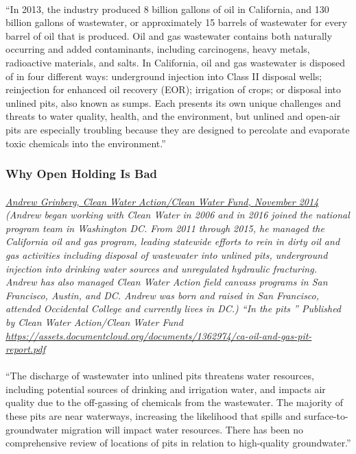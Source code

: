 \documentclass{article}
\begin{document}
\paragraph{}
``In 2013, the industry produced 8 billion gallons of oil in California, and 130 billion gallons of wastewater, or approximately 15 barrels of wastewater for every barrel of oil that is produced. Oil and gas wastewater contains both naturally occurring and added contaminants, including carcinogens, heavy metals, radioactive materials, and salts. In California, oil and gas wastewater is disposed of in four different ways: underground injection into Class II disposal wells; reinjection for enhanced oil recovery (EOR); irrigation of crops; or disposal into unlined pits, also known as sumps. Each presents its own unique challenges and threats to water quality, health, and the environment, but unlined and open-air pits are especially troubling because they are designed to percolate and evaporate toxic chemicals into the environment.''

\subsubsection{Why Open Holding Is Bad}
\paragraph{}
\small
\textit{  
\underline{Andrew Grinberg, Clean Water Action/Clean Water Fund, November 2014}
  (Andrew began working with Clean Water in 2006 and in 2016 joined the national program team in Washington DC. From 2011 through 2015, he managed the California oil and gas program, leading statewide efforts to rein in dirty oil and gas activities including disposal of wastewater into unlined pits, underground injection into drinking water sources and unregulated hydraulic fracturing. Andrew has also managed Clean Water Action field canvass programs in San Francisco, Austin, and DC. Andrew was born and raised in San Francisco, attended Occidental College and currently lives in DC.) “In the pits ” Published by Clean Water Action/Clean Water Fund 
\url{https://assets.documentcloud.org/documents/1362974/ca-oil-and-gas-pit-report.pdf} }
\normalsize
\paragraph{}
``The discharge of wastewater into unlined pits threatens water resources, including potential sources of drinking and irrigation water, and impacts air quality due to the off-gassing of chemicals from the wastewater. The majority of these pits are near waterways, increasing the likelihood that spills and surface-to-groundwater migration will impact water resources. There has been no comprehensive review of locations of pits in relation to high-quality groundwater.''
\end{document}
